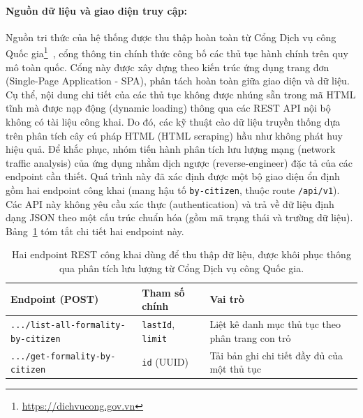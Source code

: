 \documentclass[11pt]{article}
\begin{document}
\paragraph{Nguồn dữ liệu và giao diện truy cập: }
Nguồn tri thức của hệ thống được thu thập hoàn toàn từ Cổng Dịch vụ công Quốc gia\footnote{\url{https://dichvucong.gov.vn}}~\citep{dichvucong}, cổng thông tin chính thức công bố các thủ tục hành chính trên quy mô toàn quốc. Cổng này được xây dựng theo kiến trúc ứng dụng trang đơn (Single-Page Application - SPA), phân tách hoàn toàn giữa giao diện và dữ liệu. Cụ thể, nội dung chi tiết của các thủ tục không được nhúng sẵn trong mã HTML tĩnh mà được nạp động (dynamic loading) thông qua các REST API nội bộ không có tài liệu công khai. Do đó, các kỹ thuật cào dữ liệu truyền thống dựa trên phân tích cây cú pháp HTML (HTML scraping) hầu như không phát huy hiệu quả. Để khắc phục, nhóm tiến hành phân tích lưu lượng mạng (network traffic analysis) của ứng dụng nhằm dịch ngược (reverse-engineer) đặc tả của các endpoint cần thiết. Quá trình này đã xác định được một bộ giao diện ổn định gồm hai endpoint công khai (mang hậu tố \texttt{by-citizen}, thuộc route \texttt{/api/v1}). Các API này không yêu cầu xác thực (authentication) và trả về dữ liệu định dạng JSON theo một cấu trúc chuẩn hóa (gồm mã trạng thái và trường dữ liệu). Bảng~\ref{tab:api} tóm tắt chi tiết hai endpoint này.

\begin{table}[H]
\centering
\small
\renewcommand{\arraystretch}{1.3}
\begin{tabular}{@{}l l p{6.0cm}@{}}
\toprule
Endpoint (POST) & Tham số chính & Vai trò \\
\midrule
\texttt{.../list-all-formality-by-citizen} & \texttt{lastId}, \texttt{limit} & Liệt kê danh mục thủ tục theo phân trang con trỏ \\
\texttt{.../get-formality-by-citizen} & \texttt{id} (UUID) & Tải bản ghi chi tiết đầy đủ của một thủ tục \\
\bottomrule
\end{tabular}
\caption{Hai endpoint REST công khai dùng để thu thập dữ liệu, được khôi phục thông qua phân tích lưu lượng từ Cổng Dịch vụ công Quốc gia.}
\label{tab:api}
\end{table}
\end{document}
